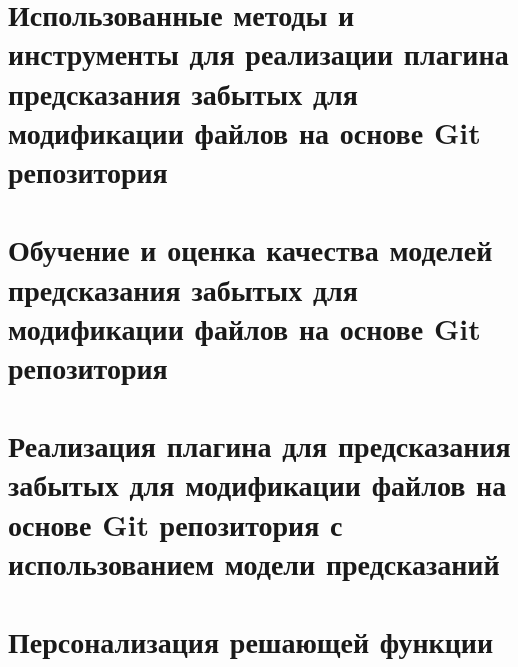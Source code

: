 \documentclass[times,specification,annotation]{itmo-student-thesis}
\begin{document}
\chapter{Использованные методы и инструменты для реализации плагина предсказания забытых для модификации файлов на основе Git репозитория}


\chapter{Обучение и оценка качества моделей предсказания забытых для модификации файлов на основе Git репозитория}\label{chapter3}


\chapter{Реализация плагина для предсказания забытых для модификации файлов на основе Git репозитория с использованием модели предсказаний}\label{chapter4}


\startconclusionpage


\printmainbibliography

\appendix

\chapter{Персонализация решающей функции}

\end{document}

